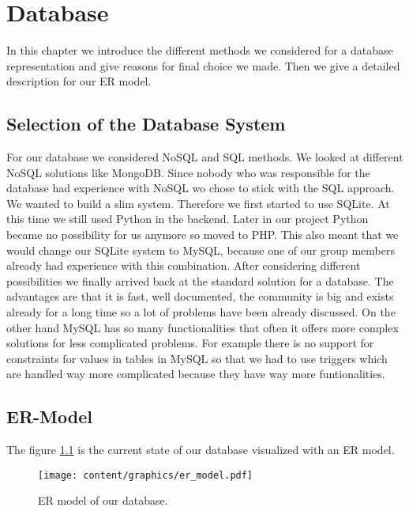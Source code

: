 \chapter{Database}

In this chapter we introduce the different methods we considered for a database representation and give reasons for final choice we made. Then we give a detailed description for our ER model.

\section{Selection of the Database System}
For our database we considered NoSQL and SQL methods. We looked at different NoSQL solutions like MongoDB. Since nobody who was responsible for the database had experience with NoSQL wo chose to stick with the SQL approach. We  wanted to build a slim system. Therefore we first started to use SQLite. At this time we still used Python in the backend. Later in our project Python became no possibility for us anymore so moved to PHP. This also meant that we would change our SQLite system to MySQL, because one of our group members already had experience with this combination. After considering different possibilities we finally arrived back at the standard solution for a database. The advantages are that it is fast, well documented, the community is big and exists already for a long time so a lot of problems have been already discussed. On the other hand MySQL has so many functionalities that often it offers more complex solutions for less complicated problems. For example there is no support for constraints for values in tables in MySQL so that we had to use triggers which are handled way more complicated because they have way more funtionalities.

\section{ER-Model}
    The figure \ref{fig:er_model} is the current state of our database visualized with an ER model.

	\begin{figure}[h!]
		\centering
			\texttt{[image: content/graphics/er\_model.pdf]}
		\caption{ER model of our database.}
        \label{fig:er_model}
	\end{figure}

